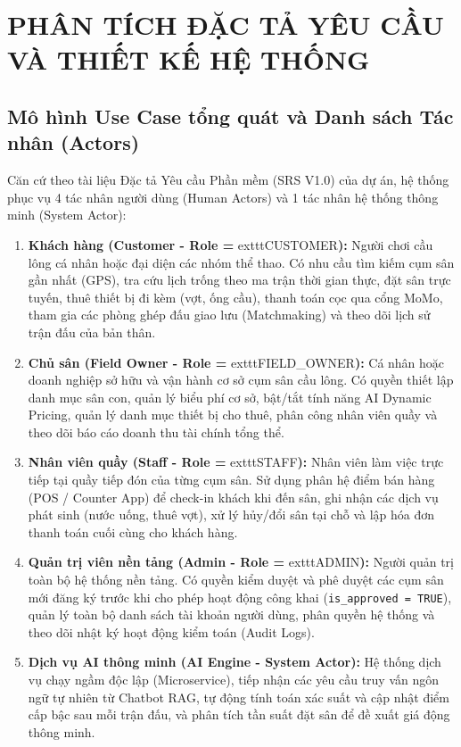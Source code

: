 
\chapter{PHÂN TÍCH ĐẶC TẢ YÊU CẦU VÀ THIẾT KẾ HỆ THỐNG}
\label{chap:thietke}

\section{Mô hình Use Case tổng quát và Danh sách Tác nhân (Actors)}
\label{sec:usecase_tongquat}

Căn cứ theo tài liệu Đặc tả Yêu cầu Phần mềm (SRS V1.0) của dự án, hệ thống phục vụ 4 tác nhân người dùng (Human Actors) và 1 tác nhân hệ thống thông minh (System Actor):
\begin{enumerate}[label=\arabic*)]
    \item \textbf{Khách hàng (Customer - Role = }	exttt{CUSTOMER}\textbf{):} Người chơi cầu lông cá nhân hoặc đại diện các nhóm thể thao. Có nhu cầu tìm kiếm cụm sân gần nhất (GPS), tra cứu lịch trống theo ma trận thời gian thực, đặt sân trực tuyến, thuê thiết bị đi kèm (vợt, ống cầu), thanh toán cọc qua cổng MoMo, tham gia các phòng ghép đấu giao lưu (Matchmaking) và theo dõi lịch sử trận đấu của bản thân.
    \item \textbf{Chủ sân (Field Owner - Role = }	exttt{FIELD\_OWNER}\textbf{):} Cá nhân hoặc doanh nghiệp sở hữu và vận hành cơ sở cụm sân cầu lông. Có quyền thiết lập danh mục sân con, quản lý biểu phí cơ sở, bật/tắt tính năng AI Dynamic Pricing, quản lý danh mục thiết bị cho thuê, phân công nhân viên quầy và theo dõi báo cáo doanh thu tài chính tổng thể.
    \item \textbf{Nhân viên quầy (Staff - Role = }	exttt{STAFF}\textbf{):} Nhân viên làm việc trực tiếp tại quầy tiếp đón của từng cụm sân. Sử dụng phân hệ điểm bán hàng (POS / Counter App) để check-in khách khi đến sân, ghi nhận các dịch vụ phát sinh (nước uống, thuê vợt), xử lý hủy/đổi sân tại chỗ và lập hóa đơn thanh toán cuối cùng cho khách hàng.
    \item \textbf{Quản trị viên nền tảng (Admin - Role = }	exttt{ADMIN}\textbf{):} Người quản trị toàn bộ hệ thống nền tảng. Có quyền kiểm duyệt và phê duyệt các cụm sân mới đăng ký trước khi cho phép hoạt động công khai (\texttt{is\_approved = TRUE}), quản lý toàn bộ danh sách tài khoản người dùng, phân quyền hệ thống và theo dõi nhật ký hoạt động kiểm toán (Audit Logs).
    \item \textbf{Dịch vụ AI thông minh (AI Engine - System Actor):} Hệ thống dịch vụ chạy ngầm độc lập (Microservice), tiếp nhận các yêu cầu truy vấn ngôn ngữ tự nhiên từ Chatbot RAG, tự động tính toán xác suất và cập nhật điểm cấp bậc sau mỗi trận đấu, và phân tích tần suất đặt sân để đề xuất giá động thông minh.
\end{enumerate}

